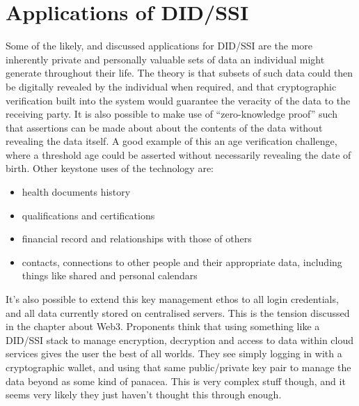 \section{Applications of DID/SSI}
Some of the likely, and discussed applications for DID/SSI are the more inherently private and personally valuable sets of data an individual might generate throughout their life. The theory is that subsets of such data could then be digitally revealed by the individual when required, and that cryptographic verification built into the system would guarantee the veracity of the data to the receiving party. It is also possible to make use of ``zero-knowledge proof'' such that assertions can be made about about the contents of the data without revealing the data itself. A good example of this an age verification challenge, where a threshold age could be asserted without necessarily revealing the date of birth. 
Other keystone uses of the technology are:
\begin{itemize}
\item health documents history
\item qualifications and certifications
\item financial record and relationships with those of others
\item contacts, connections to other people and their appropriate data, including things like shared and personal calendars
\end{itemize}  
It's also possible to extend this key management ethos to all login credentials, and all data currently stored on centralised servers. This is the tension discussed in the chapter about Web3. Proponents think that using something like a DID/SSI stack to manage encryption, decryption and access to data within cloud services gives the user the best of all worlds. They see simply logging in with a cryptographic wallet, and using that same public/private key pair to manage the data beyond as some kind of panacea. This is very complex stuff though, and it seems very likely they just haven't thought this through enough.
